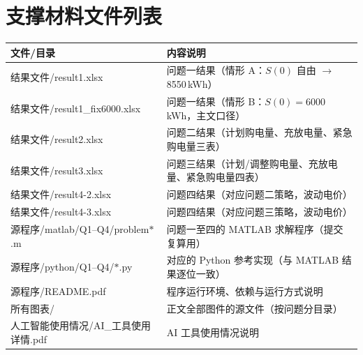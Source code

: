 \section{支撑材料文件列表}

\begin{table}[H]
\centering
\small
\setlength{\tabcolsep}{5pt}
\begin{tabular}{ll}
\toprule
文件/目录 & 内容说明 \\
\midrule
结果文件/result1.xlsx & 问题一结果（情形 A：$S(0)$ 自由 $\to$ 8550\,kWh） \\
结果文件/result1\_fix6000.xlsx & 问题一结果（情形 B：$S(0)=6000$\,kWh，主文口径） \\
结果文件/result2.xlsx & 问题二结果（计划购电量、充放电量、紧急购电量三表） \\
结果文件/result3.xlsx & 问题三结果（计划/调整购电量、充放电量、紧急购电量四表） \\
结果文件/result4-2.xlsx & 问题四结果（对应问题二策略，波动电价） \\
结果文件/result4-3.xlsx & 问题四结果（对应问题三策略，波动电价） \\
源程序/matlab/Q1--Q4/problem$*$.m & 问题一至四的 MATLAB 求解程序（提交复算用） \\
源程序/python/Q1--Q4/$*$.py & 对应的 Python 参考实现（与 MATLAB 结果逐位一致） \\
源程序/README.pdf & 程序运行环境、依赖与运行方式说明 \\
所有图表/ & 正文全部图件的源文件（按问题分目录） \\
人工智能使用情况/AI\_工具使用详情.pdf & AI 工具使用情况说明 \\
\bottomrule
\end{tabular}
\end{table}
